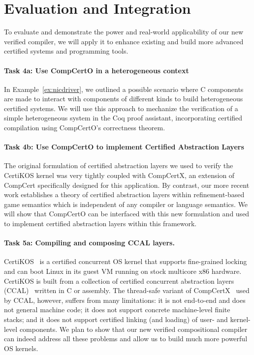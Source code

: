 \section{Evaluation and Integration}

To evaluate and demonstrate the power and real-world applicability of
our new verified compiler, we will apply it to enhance existing and
build more advanced certified systems and programming tools.

\vspace*{-2ex}
\paragraph*{Task 4a: Use CompCertO in a heterogeneous context}

In Example~\ref{ex:nicdriver},
we outlined a possible scenario where C components
are made to interact with components of different kinds
to build heterogeneous certified systems.
We will use this approach to
mechanize the verification of a simple heterogeneous system
in the Coq proof assistant,
incorporating certified compilation using CompCertO's correctness theorem.

\vspace*{-2ex}
\paragraph*{Task 4b: Use CompCertO to implement Certified Abstraction Layers}

The original formulation of certified abstraction layers
we used to verify the CertiKOS kernel \cite{popl15}
was very tightly coupled with CompCertX,
an extension of CompCert specifically designed for this application.
By contrast,
our more recent work establishes a theory of certified abstraction layers
within refinement-based game semantics
which is independent of any compiler
or language semantics.
We will show that CompCertO can be interfaced with this new formulation
and used to implement certified abstraction layers within this framework.

\vspace*{-2ex}
\paragraph*{Task 5a: Compiling and composing CCAL layers.}
CertiKOS~\cite{certikos-osdi16} is a certified concurrent OS kernel
that supports fine-grained locking and can boot Linux in its guest VM
running on stock multicore x86 hardware.  CertiKOS is built from a
collection of certified concurrent abstraction layers
(CCAL)~\cite{ccal18} written in C or assembly.  The thread-safe
variant of CompCertX~\cite{dscal15} used by CCAL, however, suffers
from many limitations: it is not end-to-end and does not general
machine code; it does not support concrete machine-level finite
stacks; and it does not support certified linking (and loading) of
user- and kernel-level components. We plan to show that our new
verified compositional compiler can indeed address all these problems
and allow us to build much more powerful OS kernels.

